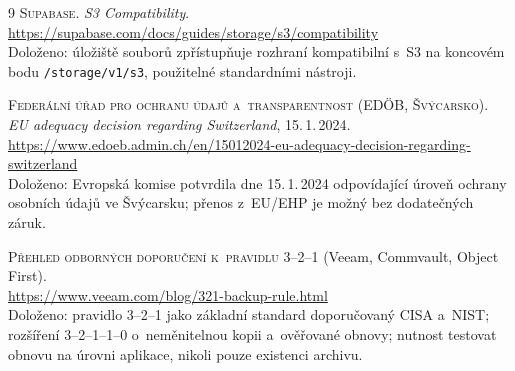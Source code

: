 \documentclass[11pt,a4paper]{article}
\begin{document}
\begin{thebibliography}{9}
\textsc{Supabase.} \emph{S3 Compatibility}.\\
\url{https://supabase.com/docs/guides/storage/s3/compatibility}\\
{\color{muted}Doloženo: úložiště souborů zpřístupňuje rozhraní kompatibilní s~S3 na koncovém bodu
\texttt{/storage/v1/s3}, použitelné standardními nástroji.}

\textsc{Federální úřad pro ochranu údajů a~transparentnost (EDÖB, Švýcarsko).}
\emph{EU adequacy decision regarding Switzerland}, 15.\,1.\,2024.\\
\url{https://www.edoeb.admin.ch/en/15012024-eu-adequacy-decision-regarding-switzerland}\\
{\color{muted}Doloženo: Evropská komise potvrdila dne 15.\,1.\,2024 odpovídající úroveň ochrany
osobních údajů ve Švýcarsku; přenos z~EU/EHP je možný bez dodatečných záruk.}

\textsc{Přehled odborných doporučení k~pravidlu 3--2--1} (Veeam, Commvault, Object First).\\
\url{https://www.veeam.com/blog/321-backup-rule.html}\\
{\color{muted}Doloženo: pravidlo 3--2--1 jako základní standard doporučovaný CISA a~NIST;
rozšíření 3--2--1--1--0 o~neměnitelnou kopii a~ověřované obnovy; nutnost testovat obnovu na
úrovni aplikace, nikoli pouze existenci archivu.}

\end{thebibliography}
\end{document}
